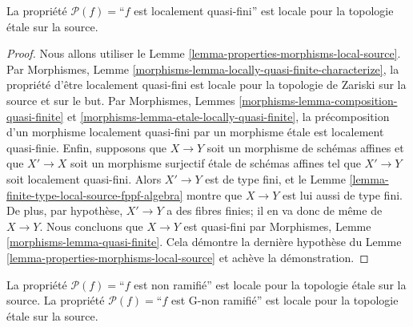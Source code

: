 \begin{lemma}
\label{lemma-locally-quasi-finite-etale-local-source}
La propriété $\mathcal{P}(f)=$``$f$ est localement quasi-fini''
est locale pour la topologie \'etale sur la source.
\end{lemma}

\begin{proof}
Nous allons utiliser le
Lemme \ref{lemma-properties-morphisms-local-source}.
Par Morphismes,
Lemme \ref{morphisms-lemma-locally-quasi-finite-characterize},
la propriété d'être localement quasi-fini est locale pour la topologie de
Zariski sur la source et sur le but. Par
Morphismes, Lemmes
\ref{morphisms-lemma-composition-quasi-finite} et
\ref{morphisms-lemma-etale-locally-quasi-finite},
la précomposition d'un morphisme localement quasi-fini par un morphisme
\'etale est localement quasi-finie.
Enfin, supposons que $X \to Y$ soit un morphisme de schémas affines et que
$X' \to X$ soit un morphisme surjectif \'etale de schémas affines tel que
$X' \to Y$ soit localement quasi-fini. Alors $X' \to Y$ est de type fini, et
le Lemme \ref{lemma-finite-type-local-source-fppf-algebra}
montre que $X \to Y$ est lui aussi de type fini.
De plus, par hypothèse, $X' \to Y$ a des fibres finies; il en va donc de même
de $X \to Y$. Nous concluons que $X \to Y$ est quasi-fini par
Morphismes, Lemme \ref{morphisms-lemma-quasi-finite}.
Cela démontre la dernière hypothèse du
Lemme \ref{lemma-properties-morphisms-local-source}
et achève la démonstration.
\end{proof}

\begin{lemma}
\label{lemma-unramified-etale-local-source}
La propriété $\mathcal{P}(f)=$``$f$ est non ramifié''
est locale pour la topologie \'etale sur la source.
La propriété $\mathcal{P}(f)=$``$f$ est G-non ramifié''
est locale pour la topologie \'etale sur la source.
\end{lemma}

